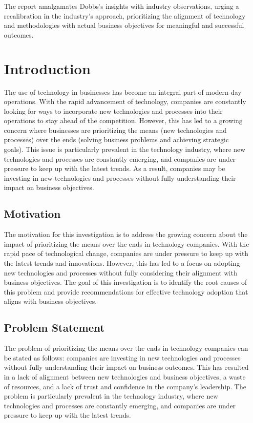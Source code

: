 \documentclass[a4Paper]{article}
\begin{document}
The report amalgamates Dobbs's insights with industry observations, urging a recalibration in the industry's approach, prioritizing the alignment of technology and methodologies with actual business objectives for meaningful and successful outcomes.

\pagebreak
\section{Introduction}
The use of technology in businesses has become an integral part of modern-day operations. With the rapid advancement of technology, companies are constantly looking for ways to incorporate new technologies and processes into their operations to stay ahead of the competition. However, this has led to a growing concern where businesses are prioritizing the means (new technologies and processes) over the ends (solving business problems and achieving strategic goals). This issue is particularly prevalent in the technology industry, where new technologies and processes are constantly emerging, and companies are under pressure to keep up with the latest trends. As a result, companies may be investing in new technologies and processes without fully understanding their impact on business objectives.

\subsection{Motivation}
The motivation for this investigation is to address the growing concern about the impact of prioritizing the means over the ends in technology companies. With the rapid pace of technological change, companies are under pressure to keep up with the latest trends and innovations. However, this has led to a focus on adopting new technologies and processes without fully considering their alignment with business objectives. The goal of this investigation is to identify the root causes of this problem and provide recommendations for effective technology adoption that aligns with business objectives.

\subsection{Problem Statement}
The problem of prioritizing the means over the ends in technology companies can be stated as follows: companies are investing in new technologies and processes without fully understanding their impact on business outcomes. This has resulted in a lack of alignment between new technologies and business objectives, a waste of resources, and a lack of trust and confidence in the company's leadership. The problem is particularly prevalent in the technology industry, where new technologies and processes are constantly emerging, and companies are under pressure to keep up with the latest trends.
\end{document}
